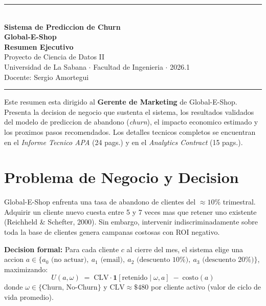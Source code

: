 \documentclass[11pt,a4paper]{article}
\newcommand{\kpibox}[2]{%
  \begin{tcolorbox}[colback=lightblue,colframe=primary,
    title={\bfseries\color{primary}#1},
    left=6pt, right=6pt, top=5pt, bottom=5pt, boxrule=0.8pt, arc=4pt]
    #2
  \end{tcolorbox}%
}
\begin{document}
\thispagestyle{empty}

\begin{center}
  \vspace*{0.5cm}
  {\color{primary}\rule{\linewidth}{2pt}}\\[0.7cm]
  {\LARGE\bfseries\color{primary} Sistema de Prediccion de Churn}\\[6pt]
  {\LARGE\bfseries\color{primary} Global-E-Shop}\\[0.5cm]
  {\large\bfseries Resumen Ejecutivo}\\[0.4cm]
  {\large\color{darkgray} Proyecto de Ciencia de Datos II}\\
  {\color{darkgray} Universidad de La Sabana $\cdot$ Facultad de Ingenieria $\cdot$ 2026.1}\\[4pt]
  {\color{darkgray} Docente: Sergio Amortegui}\\[0.5cm]
  {\color{primary}\rule{\linewidth}{2pt}}
\end{center}

\vspace{0.5cm}

\kpibox{Proposito de este Documento}{%
  Este resumen esta dirigido al \textbf{Gerente de Marketing} de Global-E-Shop.
  Presenta la decision de negocio que sustenta el sistema, los resultados
  validados del modelo de prediccion de abandono (\textit{churn}), el impacto
  economico estimado y los proximos pasos recomendados.
  Los detalles tecnicos completos se encuentran en el \textit{Informe Tecnico APA}
  (24 pags.) y en el \textit{Analytics Contract} (15 pags.).
}

\vspace{0.4cm}

\section{Problema de Negocio y Decision}

Global-E-Shop enfrenta una tasa de abandono de clientes del $\approx 10\%$ trimestral.
Adquirir un cliente nuevo cuesta entre 5 y 7 veces mas que retener uno existente
(Reichheld \& Schefter, 2000). Sin embargo, intervenir indiscriminadamente
sobre toda la base de clientes genera campanas costosas con ROI negativo.

\textbf{Decision formal:} Para cada cliente $c$ al cierre del mes, el sistema elige
una accion $a \in \{a_0\text{ (no actuar)},\ a_1\text{ (email)},\ a_2\text{ (descuento 10\%)},
\ a_3\text{ (descuento 20\%)}\}$, maximizando:
\[
  U(a,\omega) \;=\; \mathrm{CLV} \cdot \mathbf{1}[\text{retenido} \mid \omega, a]
                 \;-\; \mathrm{costo}(a)
\]
donde $\omega \in \{\text{Churn, No-Churn}\}$ y $\mathrm{CLV} \approx \$480$
por cliente activo (valor de ciclo de vida promedio).
\end{document}
